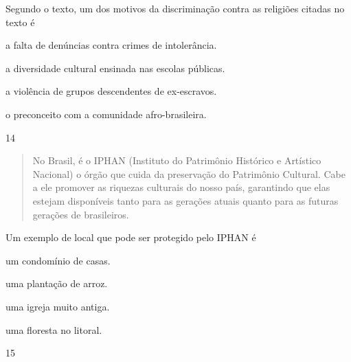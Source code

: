 Segundo o texto, um dos motivos da discriminação contra as religiões
citadas no texto é

\begin{escolha}
\item a falta de denúncias contra crimes de intolerância.

\item a diversidade cultural ensinada nas escolas públicas.

\item a violência de grupos descendentes de ex-escravos.

\item o preconceito com a comunidade afro-brasileira.
\end{escolha}


\pagebreak
\num{14}

\begin{quote}
No Brasil, é o IPHAN (Instituto do Patrimônio Histórico e Artístico Nacional) o órgão que cuida da preservação do Patrimônio Cultural. Cabe
a ele promover as riquezas culturais do nosso país, garantindo que elas estejam disponíveis tanto para as gerações atuais quanto para as futuras gerações de brasileiros.
\end{quote}

\noindent{}Um exemplo de local que pode ser protegido pelo IPHAN é

\begin{minipage}{.5\textwidth}
\begin{escolha}
\item um condomínio de casas.

\item uma plantação de arroz.

\item uma igreja muito antiga.

\item uma floresta no litoral.
\end{escolha}
\end{minipage}


\num{15}


